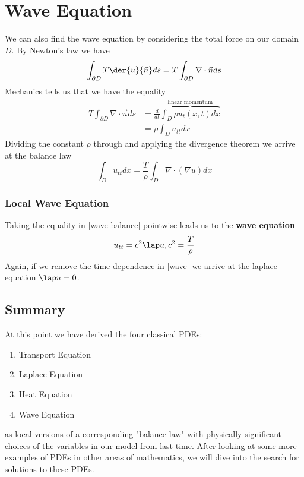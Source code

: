 \documentclass{bkcnotes}
\begin{document}
\section{Wave Equation}
We can also find the wave equation by considering the total force on
our domain $D$. By Newton's law we have
\begin{equation}
  \label{eq:newton}
  \int_{\partial D} T \der{u}{\vec{n}}ds = T \int_{\partial D} \nabla \cdot \vec{n}ds
\end{equation}
Mechanics tells us that we have the equality
\begin{align*}
  T \int_{\partial D} \nabla \cdot \vec{n}ds &=
  \frac{d}{dt}\overbrace{\int_{D}\rho u_t(x,t)dx}^{\text{linear
      momentum}} \\
  &= \rho\int_D u_{tt}dx
\end{align*}
Dividing the constant $\rho$ through and applying the divergence
theorem we arrive at the balance law
\begin{equation}
  \label{eq:wave-balance}
  \int_{D} u_{tt}dx = \frac{T}{\rho}\int_{D} \nabla \cdot (\nabla u)dx
\end{equation}

\subsubsection{Local Wave Equation}
Taking the equality in \ref{wave-balance} pointwise leads us to the
\textbf{wave equation}
\begin{equation}
  \label{eq:wave}
  u_{tt} = c^2\lap u, c^2 = \frac{T}{\rho}
\end{equation}
Again, if we remove the time dependence in \ref{wave} we arrive at the
laplace equation $\lap u = 0$.

\subsection{Summary}
At this point we have derived the four classical PDEs:
\begin{enumerate}
\item Transport Equation
\item Laplace Equation
\item Heat Equation
\item Wave Equation
\end{enumerate}
as local versions of a corresponding "balance law" with physically
significant choices of the variables in our model from last
time. After looking at some more examples of PDEs in other areas of
mathematics, we will dive into the search for solutions to these PDEs.
\end{document}
